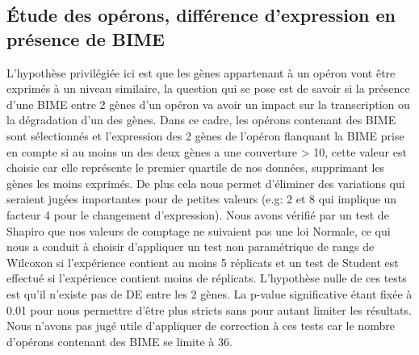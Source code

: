 \documentclass[12pt,a4paper]{report}
\begin{document}
\begin{onehalfspace}
\section*{Étude des opérons, différence d'expression en présence de BIME}
L'hypothèse privilégiée ici est que les gènes appartenant à un opéron vont être exprimés à un niveau similaire, la question qui se pose est de savoir si la présence d'une BIME entre 2 gènes d'un opéron va avoir un impact sur la transcription ou la dégradation d'un des gènes. Dans ce cadre, les opérons contenant des BIME sont sélectionnés et l'expression des 2 gènes de l'opéron flanquant la BIME prise en compte si au moins un des deux gènes a une couverture > 10, cette valeur est choisie car elle représente le premier quartile de nos données, supprimant les gènes les moins exprimés. De plus cela nous permet d'éliminer des variations qui seraient jugées importantes pour de petites valeurs (e.g: 2 et 8 qui implique un facteur 4 pour le changement d'expression). Nous avons vérifié par un test de Shapiro que nos valeurs de comptage ne suivaient pas une loi Normale, ce qui nous a conduit à choisir d'appliquer un test non paramétrique de rangs de Wilcoxon si l'expérience contient au moins 5 réplicats et un test de Student est effectué si l'expérience contient moins de réplicats. L'hypothèse nulle de ces tests est qu'il n'existe pas de DE entre les 2 gènes. La p-value significative étant fixée à 0.01 pour nous permettre d'être plus stricts sans pour autant limiter les résultats. Nous n'avons pas jugé utile d'appliquer de correction à ces tests car le nombre d'opérons contenant des BIME se limite à 36.


\end{onehalfspace}
\end{document}
